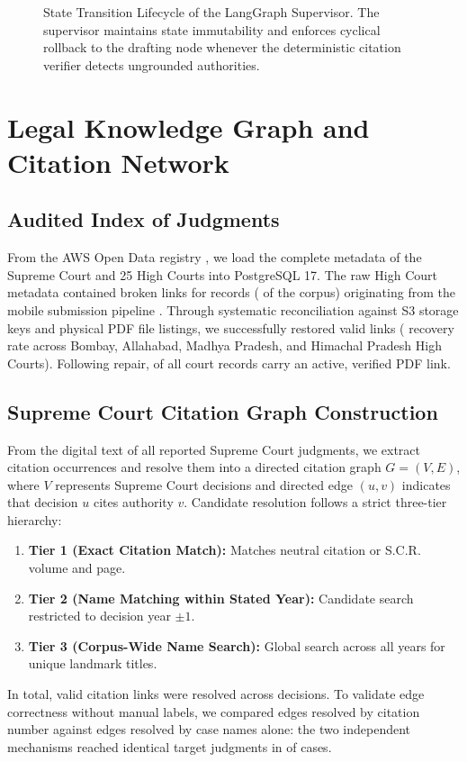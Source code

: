 \documentclass[conference]{IEEEtran}
\begin{document}
\begin{figure}[t]
\begin{tikzpicture}
\end{tikzpicture}
\caption{State Transition Lifecycle of the LangGraph Supervisor. The supervisor maintains state immutability and enforces cyclical rollback to the drafting node whenever the deterministic citation verifier detects ungrounded authorities.}
\label{fig:statemachine}
\end{figure}

\section{Legal Knowledge Graph and Citation Network}
\label{sec:corpus_graph}
\subsection{Audited Index of \CorpusTotal{} Judgments}
\label{sec:corpus}
From the AWS Open Data registry \cite{awssc,awshc}, we load the complete metadata of the Supreme Court and 25 High Courts into PostgreSQL 17. The raw High Court metadata contained broken links for \MobileTotal{} records (\MobilePct{} of the corpus) originating from the mobile submission pipeline \cite{hcdatasetdoc}. Through systematic reconciliation against S3 storage keys and physical PDF file listings, we successfully restored \MobileLinked{} valid links (\MobileLinkedPct{} recovery rate across Bombay, Allahabad, Madhya Pradesh, and Himachal Pradesh High Courts). Following repair, \LinkedPct{} of all \CorpusTotal{} court records carry an active, verified PDF link.

\subsection{Supreme Court Citation Graph Construction}
\label{sec:graph}
From the digital text of all \GraphTextOK{} reported Supreme Court judgments, we extract citation occurrences and resolve them into a directed citation graph $G = (V, E)$, where $V$ represents Supreme Court decisions and directed edge $(u, v)$ indicates that decision $u$ cites authority $v$. Candidate resolution follows a strict three-tier hierarchy:
\begin{enumerate}
    \item \textbf{Tier 1 (Exact Citation Match):} Matches neutral citation or S.C.R. volume and page.
    \item \textbf{Tier 2 (Name Matching within Stated Year):} Candidate search restricted to decision year $\pm 1$.
    \item \textbf{Tier 3 (Corpus-Wide Name Search):} Global search across all years for unique landmark titles.
\end{enumerate}
In total, \GraphEdges{} valid citation links were resolved across \GraphTextOK{} decisions. To validate edge correctness without manual labels, we compared edges resolved by citation number against edges resolved by case names alone: the two independent mechanisms reached identical target judgments in \GraphNameSamePct{} of cases.
\end{document}
